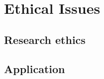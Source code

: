 \chapter{Ethical Issues}
\begin{comment}
You are required to include a short discussion of ethical, legal, societal and professional issues that are relevant to your project (usually 1 to 2 pages long). This should fit in the most appropriate section of your project report, often the Background or Conclusions section.
\end{comment}


\section{Research ethics}
\section{Application}
